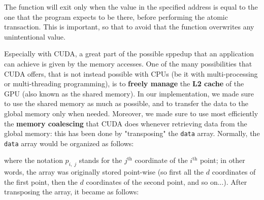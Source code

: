 \documentclass[11pt, journal]{IEEEtran}
\newcommand{\nwl}{

\vspace{11pt}

}
\begin{document}
The function will exit only when the value in the specified address is equal to the one that the program expects to be there, before performing the atomic transaction. This is important, so that to avoid that the function overwrites any unintentional value.
\nwl
Especially with CUDA, a great part of the possible sppedup that an application can achieve is given by the memory accesses. One of the many possibilities that CUDA offers, that is not instead possible with CPUs (be it with multi-processing or multi-threading programming), is to \textbf{freely manage} the \textbf{L2 cache} of the GPU (also known as the shared memory). In our implementation, we made sure to use the shared memory as much as possible, and to transfer the data to the global memory only when needed. Moreover, we made sure to use most efficiently the \textbf{memory coalescing} that CUDA does whenever retrieving data from the global memory: this has been done by "transposing" the \verb|data| array. Normally, the \verb|data| array would be organized as follows:

\begin{center}
\end{center}

\nwl
where the notation $p_{i, \; j}$ stands for the $j^{\text{th}}$ coordinate of the $i^{\text{th}}$ point; in other words, the array was originally stored point-wise (so first all the $d$ coordinates of the first point, then the $d$ coordinates of the second point, and so on...). After transposing the array, it became as follows:
\end{document}
